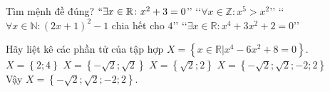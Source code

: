\begin{ex}%
	Tìm mệnh đề đúng?
	\choice
	{$\lq\lq\exists x\in\mathbb{R}\colon{x^2}+3=0$\rq\rq}
	{\lq\lq$\forall x\in\mathbb{Z}\colon{x^5}>x^2$\rq\rq}
	{\True \lq\lq$\forall x\in\mathbb{N}\colon\left(2x+1\right)^2-1$ chia hết cho $4$\rq\rq}
	{\lq\lq$\exists x\in\mathbb{R}\colon{x^4}+3x^2+2=0$\rq\rq}
\end{ex}
%
\begin{ex}%
	Hãy liệt kê các phần tử của tập hợp $X=\left\{ x\in\mathbb{R}\big|{x^4}-6x^2+8=0\right\}$.
	\choice
	{$X=\left\{ 2;4\right\}$}
	{$X=\left\{-\sqrt{2};\sqrt{2}\right\}$}
	{$X=\left\{\sqrt{2};2\right\}$} {$X=\left\{-\sqrt{2};\sqrt{2};-2;2\right\}$}
	\\
	Vậy $X=\left\{-\sqrt{2};\sqrt{2};-2;2\right\}$.
\end{ex}

